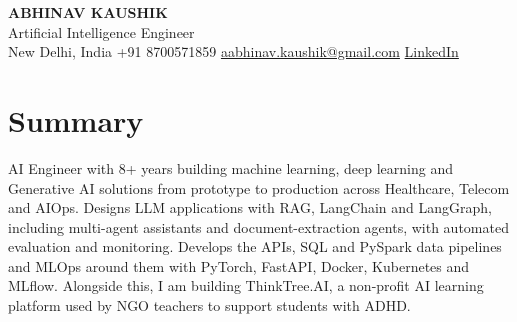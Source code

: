 \documentclass[10pt,a4paper]{article}
\begin{document}
\begin{center}
  {\LARGE\bfseries ABHINAV KAUSHIK}\\[2pt]
  {\large Artificial Intelligence Engineer}\\[2pt]
  New Delhi, India \textbar{} +91 8700571859 \textbar{} \href{mailto:aabhinav.kaushik@gmail.com}{aabhinav.kaushik@gmail.com} \textbar{} \href{https://www.linkedin.com/in/abhinav-kaushik10/}{LinkedIn}  
\end{center}

\section{Summary}
AI Engineer with 8+ years building machine learning, deep learning and Generative AI solutions from prototype to production across Healthcare, Telecom and AIOps. Designs LLM applications with RAG, LangChain and LangGraph, including multi-agent assistants and document-extraction agents, with automated evaluation and monitoring. Develops the APIs, SQL and PySpark data pipelines and MLOps around them with PyTorch, FastAPI, Docker, Kubernetes and MLflow. Alongside this, I am building ThinkTree.AI, a non-profit AI learning platform used by NGO teachers to support students with ADHD.
\end{document}
